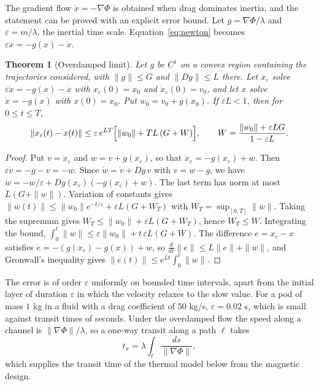 \documentclass[11pt,openany]{book}
\theoremstyle{plain}
\newtheorem{theorem}{Theorem}[chapter]
\theoremstyle{definition}
\theoremstyle{remark}
\begin{document}
The gradient flow $\dot x=-\nabla\Phi$ is obtained when drag dominates inertia, and the statement can be proved with an explicit error bound. Let $g=\nabla\Phi/\lambda$ and $\varepsilon=m/\lambda$, the inertial time scale. Equation~\eqref{eq:newton} becomes $\varepsilon\ddot x=-g(x)-\dot x$.

\begin{theorem}[Overdamped limit]
\label{thm:overdamped}
Let $g$ be $C^1$ on a convex region containing the trajectories considered, with $\|g\|\le G$ and $\|Dg\|\le L$ there. Let $x_\varepsilon$ solve $\varepsilon\ddot x=-g(x)-\dot x$ with $x_\varepsilon(0)=x_0$ and $\dot x_\varepsilon(0)=v_0$, and let $x$ solve $\dot x=-g(x)$ with $x(0)=x_0$. Put $w_0=v_0+g(x_0)$. If $\varepsilon L<1$, then for $0\le t\le T$,
\[
\|x_\varepsilon(t)-x(t)\|\le \varepsilon\, e^{LT}\Bigl[\|w_0\|+TL\,(G+W)\Bigr],\qquad W=\frac{\|w_0\|+\varepsilon LG}{1-\varepsilon L}.
\]
\end{theorem}
\begin{proof}
Put $v=\dot x_\varepsilon$ and $w=v+g(x_\varepsilon)$, so that $\dot x_\varepsilon=-g(x_\varepsilon)+w$. Then $\varepsilon\dot v=-g-v=-w$. Since $\dot w=\dot v+Dg\,v$ with $v=w-g$, we have $\dot w=-w/\varepsilon+Dg(x_\varepsilon)(-g(x_\varepsilon)+w)$. The last term has norm at most $L(G+\|w\|)$. Variation of constants gives $\|w(t)\|\le\|w_0\|e^{-t/\varepsilon}+\varepsilon L(G+W_T)$ with $W_T=\sup_{[0,T]}\|w\|$. Taking the supremum gives $W_T\le\|w_0\|+\varepsilon L(G+W_T)$, hence $W_T\le W$. Integrating the bound, $\int_0^t\|w\|\le\varepsilon\|w_0\|+t\,\varepsilon L(G+W)$. The difference $e=x_\varepsilon-x$ satisfies $\dot e=-(g(x_\varepsilon)-g(x))+w$, so $\tfrac{d}{dt}\|e\|\le L\|e\|+\|w\|$, and Gronwall's inequality gives $\|e(t)\|\le e^{Lt}\int_0^t\|w\|$.
\end{proof}

The error is of order $\varepsilon$ uniformly on bounded time intervals, apart from the initial layer of duration $\varepsilon$ in which the velocity relaxes to the slow value. For a pod of mass $1$ kg in a fluid with a drag coefficient of $50$ kg/s, $\varepsilon=0.02$ s, which is small against transit times of seconds. Under the overdamped flow the speed along a channel is $\|\nabla\Phi\|/\lambda$, so a one-way transit along a path $\ell$ takes
\begin{equation}
t_x=\lambda\int_\ell\frac{ds}{\|\nabla\Phi\|},
\label{eq:transit}
\end{equation}
which supplies the transit time of the thermal model below from the magnetic design.
\end{document}
